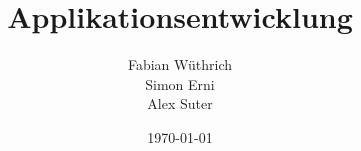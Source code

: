 \documentclass[11pt,a4paper]{scrreprt}
\begin{document}
\titlehead{Hochschule Luzern \\ 
	Technik \& Architektur}
\subject{Zusammenfassung}
\title{Applikationsentwicklung}
\subtitle{}
\author{Fabian Wüthrich \\ 
	Simon Erni \\ 
	Alex Suter}
\date{\today}

\maketitle

\tableofcontents
\end{document}
